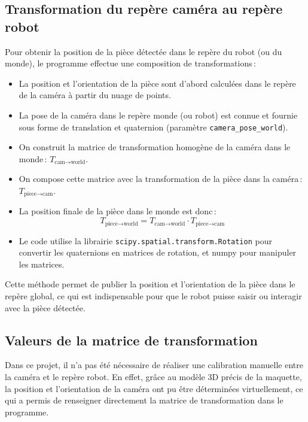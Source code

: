 \subsection{Transformation du repère caméra au repère robot}

Pour obtenir la position de la pièce détectée dans le repère du robot (ou du monde), le programme effectue une composition de transformations :

\begin{itemize}
    \item La position et l'orientation de la pièce sont d'abord calculées dans le repère de la caméra à partir du nuage de points.
    \item La pose de la caméra dans le repère monde (ou robot) est connue et fournie sous forme de translation et quaternion (paramètre \texttt{camera\_pose\_world}).
    \item On construit la matrice de transformation homogène de la caméra dans le monde : $T_{\text{cam} \to \text{world}}$.
    \item On compose cette matrice avec la transformation de la pièce dans la caméra : $T_{\text{piece} \to \text{cam}}$.
    \item La position finale de la pièce dans le monde est donc :
          \[
              T_{\text{piece} \to \text{world}} = T_{\text{cam} \to \text{world}} \cdot T_{\text{piece} \to \text{cam}}
          \]
    \item Le code utilise la librairie \texttt{scipy.spatial.transform.Rotation} pour convertir les quaternions en matrices de rotation, et numpy pour manipuler les matrices.
\end{itemize}

Cette méthode permet de publier la position et l'orientation de la pièce dans le repère global, ce qui est indispensable pour que le robot puisse saisir ou interagir avec la pièce détectée.

\subsection{Valeurs de la matrice de transformation}

Dans ce projet, il n'a pas été nécessaire de réaliser une calibration manuelle entre la caméra et le repère robot. En effet, grâce au modèle 3D précis de la maquette, la position et l'orientation de la caméra ont pu être déterminées virtuellement, ce qui a permis de renseigner directement la matrice de transformation dans le programme.

